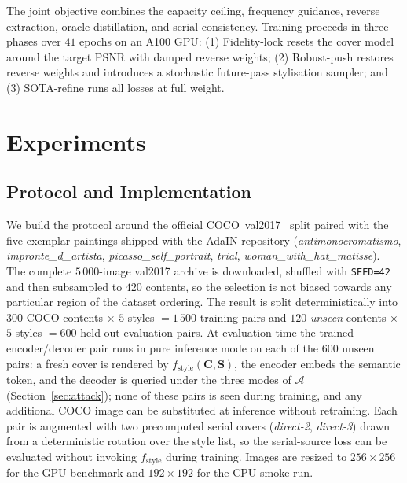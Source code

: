 \documentclass[conference]{IEEEtran}
\begin{document}
The joint objective combines the capacity ceiling, frequency guidance, reverse extraction, oracle distillation, and serial consistency. Training proceeds in three phases over $41$ epochs on an A100 GPU: (1) Fidelity-lock resets the cover model around the target PSNR with damped reverse weights; (2) Robust-push restores reverse weights and introduces a stochastic future-pass stylisation sampler; and (3) SOTA-refine runs all losses at full weight.

\section{Experiments}
\label{sec:exp}

\subsection{Protocol and Implementation}
\label{sec:impl}
We build the protocol around the official COCO~val2017~\cite{coco} split paired with the five exemplar paintings shipped with the AdaIN repository (\textit{antimonocromatismo}, \textit{impronte\allowbreak\_d\allowbreak\_artista}, \textit{picasso\allowbreak\_self\allowbreak\_portrait}, \textit{trial}, \textit{woman\allowbreak\_with\allowbreak\_hat\allowbreak\_matisse}). The complete $5\,000$-image val2017 archive is downloaded, shuffled with \texttt{SEED=42} and then subsampled to $420$ contents, so the selection is not biased towards any particular region of the dataset ordering. The result is split deterministically into $300$ COCO contents $\times$ $5$ styles $=1\,500$ training pairs and $120$ \emph{unseen} contents $\times$ $5$ styles $=600$ held-out evaluation pairs. At evaluation time the trained encoder/decoder pair runs in pure inference mode on each of the $600$ unseen pairs: a fresh cover is rendered by $f_{\text{style}}(\mathbf{C},\mathbf{S})$, the encoder embeds the semantic token, and the decoder is queried under the three modes of $\mathcal{A}$ (Section~\ref{sec:attack}); none of these pairs is seen during training, and any additional COCO image can be substituted at inference without retraining. Each pair is augmented with two precomputed serial covers (\emph{direct-2}, \emph{direct-3}) drawn from a deterministic rotation over the style list, so the serial-source loss can be evaluated without invoking $f_{\text{style}}$ during training. Images are resized to $256\!\times\!256$ for the GPU benchmark and $192\!\times\!192$ for the CPU smoke run.
\end{document}
